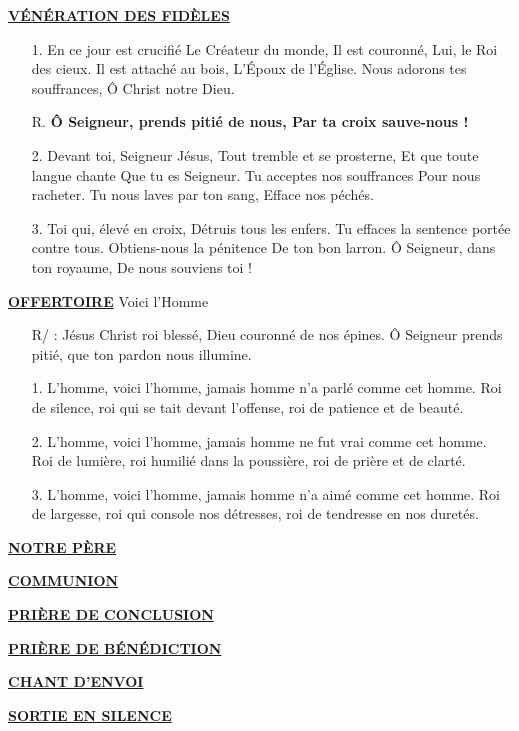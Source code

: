 \documentclass[11pt,a4paper]{article}
\newcommand{\NewsItem}[1]{%
\vspace{3pt}
\underline{\textbf{#1}}
		  }
\begin{document}
\NewsItem{VÉNÉRATION DES FIDÈLES}
\begin{framed}
\begin{itemize}
\item[1.] En ce jour est crucifié Le Créateur du monde,
Il est couronné, Lui, le Roi des cieux. Il est attaché au bois,
L’Époux de l’Église. Nous adorons tes souffrances, Ô Christ notre Dieu.
\item[R.] \textbf{Ô Seigneur, prends pitié de nous, Par ta croix sauve-nous !}
\item[2.] Devant toi, Seigneur Jésus, Tout tremble et se prosterne,
Et que toute langue chante Que tu es Seigneur. Tu acceptes nos souffrances
Pour nous racheter. Tu nous laves par ton sang, Efface nos péchés.
\item[3.] Toi qui, élevé en croix, Détruis tous les enfers. Tu effaces la sentence portée contre tous. Obtiens-nous la pénitence De ton bon larron.
Ô Seigneur, dans ton royaume, De nous souviens toi !
\end{itemize}
\end{framed}

\NewsItem{OFFERTOIRE} Voici l'Homme
\begin{itemize}
\item[R/] : Jésus Christ roi blessé, Dieu couronné de nos épines.
Ô Seigneur prends pitié, que ton pardon nous illumine.
\item[1.] L’homme, voici l’homme, jamais homme n’a parlé comme cet homme.
Roi de silence, roi qui se tait devant l’offense, roi de patience et de beauté.
\item[2.] L’homme, voici l’homme, jamais homme ne fut vrai comme cet homme.
Roi de lumière, roi humilié dans la poussière, roi de prière et de clarté.
\item[3.] L’homme, voici l’homme, jamais homme n’a aimé comme cet homme.
Roi de largesse, roi qui console nos détresses, roi de tendresse en nos duretés.
\end{itemize}

\NewsItem{NOTRE PÈRE}


\begin{framed}
\NewsItem{COMMUNION} 
\end{framed}

\NewsItem{PRIÈRE DE CONCLUSION}

\NewsItem{PRIÈRE DE BÉNÉDICTION}

\NewsItem{CHANT D'ENVOI}


\NewsItem{SORTIE EN SILENCE}
\end{document}
